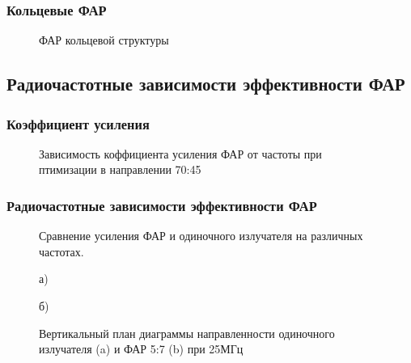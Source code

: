 \begin{frame}
    \frametitle{Кольцевые ФАР}
    \begin{figure}
    \caption{ФАР кольцевой структуры}
    \label{ris:rings}
    \end{figure}
\end{frame}

\subsection{Радиочастотные зависимости эффективности ФАР}
\begin{frame}
    \frametitle{Коэффициент усиления}

    \begin{figure}
    \caption{Зависимость коффициента усиления ФАР от частоты при птимизации в направлении 70:45}
    \label{ris:paa_gains_0}
    \end{figure}
\end{frame}


\begin{frame}
    \frametitle{Радиочастотные зависимости эффективности ФАР}
\begin{figure}
\label{ris:paa_gains}
\caption{Сравнение усиления ФАР и одиночного излучателя на различных частотах.}
\end{figure}

\begin{figure}
\begin{minipage}[h]{0.4\linewidth}
 а)
\end{minipage}
\hfill
\begin{minipage}[h]{0.4\linewidth}
 б)
\end{minipage}
\caption{Вертикальный план диаграммы направленности одиночного излучателя (a) и ФАР 5:7 (b) при 25МГц}
\label{ris:25MHz}
\end{figure}
\end{frame}


